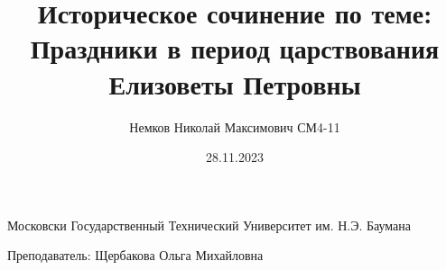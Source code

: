 

\title{Историческое сочинение по теме: Праздники в период царствования Елизоветы Петровны}
\author{Немков Николай Максимович СМ4-11}

\date{28.11.2023}



\maketitle
\begin{center}
Московски Государственный Технический Университет им. Н.Э. Баумана

Преподаватель: Щербакова Ольга Михайловна
\end{center}

